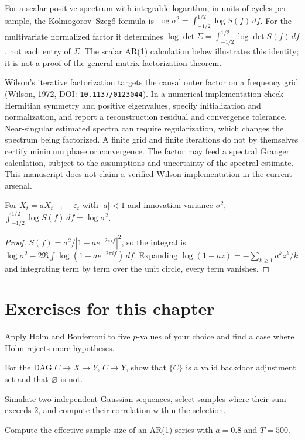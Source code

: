 For a scalar positive spectrum with integrable logarithm, in units of
cycles per sample, the Kolmogorov--Szeg\H{o} formula is
$\log\sigma^2=\int_{-1/2}^{1/2}\log S(f)\,df$.
For the multivariate normalized factor it determines
$\log\det\Sigma=\int_{-1/2}^{1/2}\log\det S(f)\,df$, not each entry
of $\Sigma$. The scalar AR(1) calculation below illustrates this identity;
it is not a proof of the general matrix factorization theorem.

Wilson's iterative factorization targets the causal outer factor on a
frequency grid (Wilson, 1972, DOI: \texttt{10.1137/0123044}). In a numerical
implementation check Hermitian symmetry and positive eigenvalues, specify
initialization and normalization, and report a reconstruction residual and
convergence tolerance. Near-singular estimated spectra can require
regularization, which changes the spectrum being factorized. A finite grid
and finite iterations do not by themselves certify minimum phase or
convergence. The factor may feed a spectral Granger calculation, subject to
the assumptions and uncertainty of the spectral estimate. This manuscript
does not claim a verified Wilson implementation in the current arsenal.

\begin{proposition}
For $X_t=aX_{t-1}+\varepsilon_t$ with $|a|<1$ and innovation variance
$\sigma^2$, $\int_{-1/2}^{1/2}\log S(f)\,df=\log\sigma^2$.
\end{proposition}
\begin{proof}
$S(f)=\sigma^2/|1-ae^{-2\pi if}|^2$, so the integral is
$\log\sigma^2-2\Re\int\log(1-ae^{-2\pi if})\,df$. Expanding
$\log(1-az)=-\sum_{k\ge1}a^kz^k/k$ and integrating term by term over the
unit circle, every term vanishes.
\end{proof}

\section*{Exercises for this chapter}
\begin{exercise}
Apply Holm and Bonferroni to five $p$-values of your choice and find a
case where Holm rejects more hypotheses.
\end{exercise}
\begin{exercise}
For the DAG $C\to X\to Y$, $C\to Y$, show that $\{C\}$ is a valid
backdoor adjustment set and that $\varnothing$ is not.
\end{exercise}
\begin{exercise}
Simulate two independent Gaussian sequences, select samples where their
sum exceeds 2, and compute their correlation within the selection.
\end{exercise}
\begin{exercise}
Compute the effective sample size of an AR(1) series with $a=0.8$ and
$T=500$.
\end{exercise}

